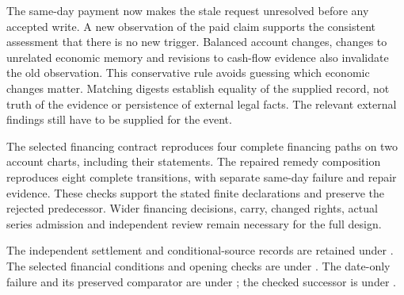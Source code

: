 The same-day payment now makes the stale request unresolved before any accepted
write. A new observation of the paid claim supports the consistent assessment
that there is no new trigger. Balanced account changes, changes to unrelated
economic memory and revisions to cash-flow evidence also invalidate the old
observation. This conservative rule avoids guessing which economic changes
matter. Matching digests establish equality of the supplied record, not truth
of the evidence or persistence of external legal facts. The relevant external
findings still have to be supplied for the event.

The selected financing contract reproduces four complete financing paths on
two account charts, including their statements. The repaired remedy composition
reproduces eight complete transitions, with separate same-day failure and repair
evidence. These checks support the stated finite declarations and preserve the
rejected predecessor. Wider financing decisions, carry, changed rights, actual
series admission and independent review remain necessary for the full design.

\begingroup\raggedright
The independent settlement and conditional-source records are retained under
.
The selected financial conditions and opening checks are under
.
The date-only failure and its preserved comparator are under
;
the checked successor is under
.
\par\endgroup
